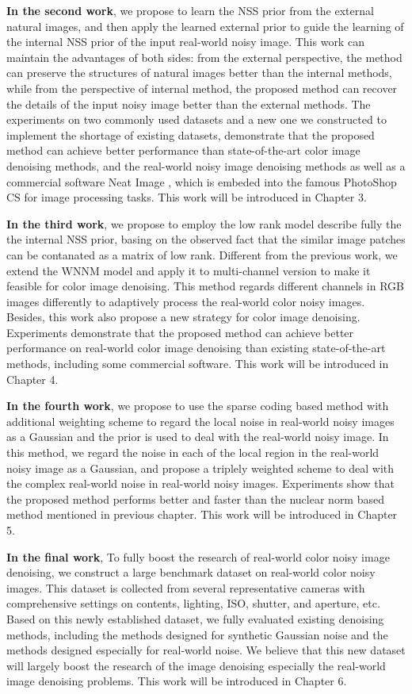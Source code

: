 \textbf{In the second work}, we propose to learn the NSS prior from the external natural images, and then apply the learned external prior to guide the learning of the internal NSS prior of the input real-world noisy image. This work can maintain the advantages of both sides: from the external perspective, the method can preserve the structures of natural images better than the internal methods, while from the perspective of internal method, the proposed method can recover the details of the input noisy image better than the external methods. The experiments on two commonly used datasets and a new one we constructed to implement the shortage of existing datasets, demonstrate that the proposed method can achieve better performance than state-of-the-art color image denoising methods, and the real-world noisy image denoising methods as well as a commercial software Neat Image \cite{neatimage}, which is embeded into the famous PhotoShop CS for image processing tasks. This work will be introduced in Chapter 3.


\textbf{In the third work}, we propose to employ the low rank model describe fully the the internal NSS prior, basing on the observed fact that the similar image patches can be contanated as a matrix of low rank. Different from the previous work, we extend the WNNM model and apply it to multi-channel version to make it feasible for color image denoising. This method regards different channels in RGB images differently to adaptively process the real-world color noisy images. Besides, this work also propose a new strategy for color image denoising. Experiments demonstrate that the proposed method can achieve better performance on real-world color image denoising than existing state-of-the-art methods, including some commercial software. This work will be introduced in Chapter 4.


\textbf{In the fourth work}, we propose to use the sparse coding based method with additional weighting scheme to regard the local noise in real-world noisy images as a Gaussian and the prior is used to deal with the real-world noisy image. In this method, we regard the noise in each of the local region in the real-world noisy image as a Gaussian, and propose a triplely weighted scheme to deal with the complex real-world noise in real-world noisy images. Experiments show that the proposed method performs better and faster than the nuclear norm based method mentioned in previous chapter. This work will be introduced in Chapter 5.


\textbf{In the final work}, To fully boost the research of real-world color noisy image denoising, we construct a large benchmark dataset on real-world color noisy images. This dataset is collected from several representative cameras with comprehensive settings on contents, lighting, ISO, shutter, and aperture, etc. Based on this newly established dataset, we fully evaluated existing denoising methods, including the methods designed for synthetic Gaussian noise and the methods designed especially for real-world noise. We believe that this new dataset will largely boost the research of the image denoising especially the real-world image denoising problems. This work will be introduced in Chapter 6.



